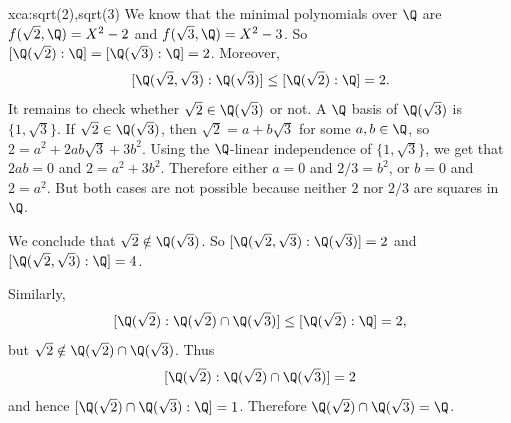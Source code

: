 \begin{sol}{xca:sqrt(2),sqrt(3)}
    We know that the minimal polynomials over $\Q$ are
    $f(\sqrt{2},\Q)=X^2-2$ and $f(\sqrt{3},\Q)=X^2-3$.
    So $[\Q(\sqrt{2}):\Q]=[\Q(\sqrt{3}):\Q]=2$.
    Moreover,
    \[
    [\Q(\sqrt{2},\sqrt{3}):\Q(\sqrt{3})]\leq [\Q(\sqrt{2}):\Q]=2.
    \]
    It remains to check whether $\sqrt{2}\in \Q(\sqrt{3})$ or not.
    A $\Q$ basis of $\Q(\sqrt{3})$ is $\{1,\sqrt{3}\}$.
    If $\sqrt{2}\in \Q(\sqrt{3})$, then $\sqrt{2}=a+b\sqrt{3}$ for 
    some $a,b\in\Q$, so $2=a^2+2ab\sqrt{3}+3b^2$.
    Using the $\Q$-linear independence of $\{1,\sqrt{3}\}$,
    we get that $2ab=0$ and $2=a^2+3b^2$.
    Therefore either $a=0$ and $2/3=b^2$,
    or $b=0$ and $2=a^2$.
    But both cases are not possible because neither $2$ nor $2/3$ are 
    squares in $\Q$.

    We conclude that $\sqrt{2}\notin\Q(\sqrt{3})$.
    So $[\Q(\sqrt{2},\sqrt{3}):\Q(\sqrt{3})]=2$ and
    $[\Q(\sqrt{2},\sqrt{3}):\Q]=4$.
    \begin{center}
    \end{center}
    Similarly, 
    \[
    [\Q(\sqrt{2}):\Q(\sqrt{2})\cap\Q(\sqrt{3})]\leq [\Q(\sqrt{2}):\Q]=2,
    \]
    but $\sqrt{2}\notin\Q(\sqrt{2})\cap\Q(\sqrt{3})$. Thus 
    \[
    [\Q(\sqrt{2}):\Q(\sqrt{2})\cap\Q(\sqrt{3})]=2
    \] 
    and hence $[\Q(\sqrt{2})\cap\Q(\sqrt{3}):\Q]=1$. Therefore  $\Q(\sqrt{2})\cap\Q(\sqrt{3})=\Q$.
\end{sol}

